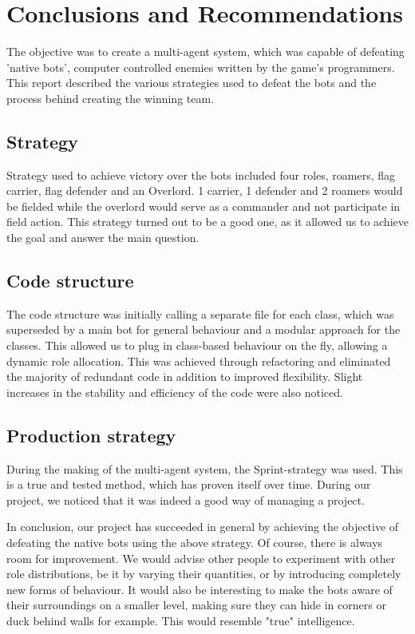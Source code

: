 \chapter{Conclusions and Recommendations}

The objective was to create a multi-agent system, which was capable of defeating 'native bots', computer controlled enemies written by the game's programmers. This report described the various strategies used to defeat the bots and the process behind creating the winning team.
    
\section{Strategy}
Strategy used to achieve victory over the bots included four roles, roamers, flag carrier, flag defender and an Overlord. 1 carrier, 1 defender and 2 roamers would be fielded while the overlord would serve as a commander and not participate in field action. This strategy turned out to be a good one, as it allowed us to achieve the goal and answer the main question.

\section{Code structure}
The code structure was initially calling a separate file for each class, which was superseded by a main bot for general behaviour and a modular approach for the classes. This allowed us to plug in class-based behaviour on the fly, allowing a dynamic role allocation. This was achieved through refactoring and eliminated the majority of redundant code in addition to improved flexibility. Slight increases in the stability and efficiency of the code were also noticed.

\section{Production strategy}
During the making of the multi-agent system, the Sprint-strategy was used. This is a true and tested method, which has proven itself over time. During our project, we noticed that it was indeed a good way of managing a project.

In conclusion, our project has succeeded in general by achieving the objective of defeating the native bots using the above strategy. Of course, there is always room for improvement. We would advise other people to experiment with other role distributions, be it by varying their quantities, or by introducing completely new forms of behaviour. It would also be interesting to make the bots aware of their surroundings on a smaller level, making sure they can hide in corners or duck behind walls for example. This would resemble "true" intelligence.
\pagebreak
